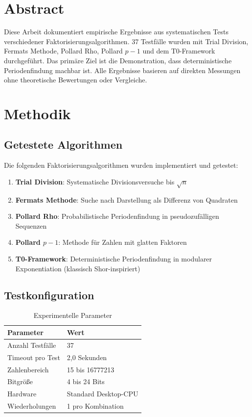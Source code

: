 \section*{Abstract}
		Diese Arbeit dokumentiert empirische Ergebnisse aus systematischen Tests verschiedener Faktorisierungsalgorithmen. 37 Testfälle wurden mit Trial Division, Fermats Methode, Pollard Rho, Pollard $p-1$ und dem T0-Framework durchgeführt. Das primäre Ziel ist die Demonstration, dass deterministische Periodenfindung machbar ist. Alle Ergebnisse basieren auf direkten Messungen ohne theoretische Bewertungen oder Vergleiche.

	
	
	\section{Methodik}
	
	\subsection{Getestete Algorithmen}
	
	Die folgenden Faktorisierungsalgorithmen wurden implementiert und getestet:
	
	\begin{enumerate}
		\item \textbf{Trial Division}: Systematische Divisionsversuche bis $\sqrt{n}$
		\item \textbf{Fermats Methode}: Suche nach Darstellung als Differenz von Quadraten
		\item \textbf{Pollard Rho}: Probabilistische Periodenfindung in pseudozufälligen Sequenzen
		\item \textbf{Pollard $p-1$}: Methode für Zahlen mit glatten Faktoren
		\item \textbf{T0-Framework}: Deterministische Periodenfindung in modularer Exponentiation (klassisch Shor-inspiriert)
	\end{enumerate}
	
	\subsection{Testkonfiguration}
	
	\begin{table}[H]
		\centering
		\caption{Experimentelle Parameter}
		\begin{tabular}{ll}
			\toprule
			\textbf{Parameter} & \textbf{Wert} \\
			\midrule
			Anzahl Testfälle & 37 \\
			Timeout pro Test & 2,0 Sekunden \\
			Zahlenbereich & 15 bis 16777213 \\
			Bitgröße & 4 bis 24 Bits \\
			Hardware & Standard Desktop-CPU \\
			Wiederholungen & 1 pro Kombination \\
			\bottomrule
		\end{tabular}
		\label{tab:test_config}
	\end{table}
	
